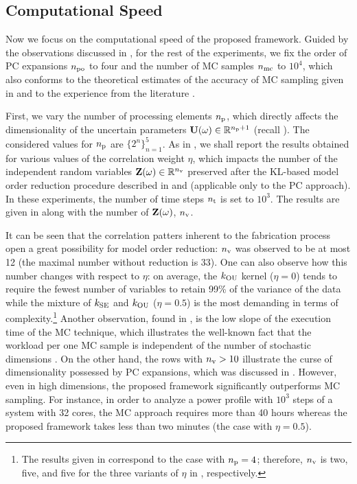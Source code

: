 \subsection{Computational Speed}

Now we focus on the computational speed of the proposed framework.
Guided by the observations discussed in , for the rest of the experiments, we fix the order of PC expansions ${n_\text{po}}$ to four and the number of MC samples ${n_\text{mc}}$ to $10^4$, which also conforms to the theoretical estimates of the accuracy of MC sampling given in \cite{diaz-emparanza2002} and to the experience from the literature \cite{xiu2010, maitre2010, shen2009, eldred2008}.

First, we vary the number of processing elements ${n_\text{p}}$, which directly affects the dimensionality of the uncertain parameters $\mathbf{U}(\omega) \in \mathbb{R}^{{n_\text{p}} + 1}$ (recall ).
The considered values for ${n_\text{p}}$ are $\{ 2^n \}_{n = 1}^5$.
As in , we shall report the results obtained for various values of the correlation weight $\eta$, which impacts the number of the independent random variables $\mathbf{Z}(\omega) \in \mathbb{R}^{n_\text{v}}$ preserved after the KL-based model order reduction procedure described in  and  (applicable only to the PC approach).
In these experiments, the number of time steps ${n_\text{t}}$ is set to $10^3$.
The results are given in  along with the number of $\mathbf{Z}(\omega)$, ${n_\text{v}}$.

It can be seen that the correlation patters inherent to the fabrication process \cite{cheng2011} open a great possibility for model order reduction: ${n_\text{v}}$ was observed to be at most 12 (the maximal number without reduction is 33).
One can also observe how this number changes with respect to $\eta$: on average, the $\fCorr_\OU$ kernel ($\eta = 0$) tends to require the fewest number of variables to retain 99\% of the variance of the data while the mixture of $\fCorr_\SE$ and $\fCorr_\OU$ ($\eta = 0.5$) is the most demanding in terms of complexity.\footnote{The results given in  correspond to the case with ${n_\text{p}} = 4$; therefore, ${n_\text{v}}$ is two, five, and five for the three variants of $\eta$ in , respectively.}
Another observation, found in , is the low slope of the execution time of the MC technique, which illustrates the well-known fact that the workload per one MC sample is independent of the number of stochastic dimensions \cite{maitre2010}.
On the other hand, the rows with ${n_\text{v}} > 10$ illustrate the curse of dimensionality possessed by PC expansions, which was discussed in .
However, even in high dimensions, the proposed framework significantly outperforms MC sampling. For instance, in order to analyze a power profile with $10^3$ steps of a system with 32 cores, the MC approach requires more than 40 hours whereas the proposed framework takes less than two minutes (the case with $\eta = 0.5$).

